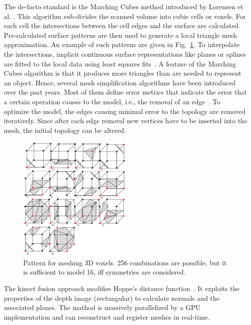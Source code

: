 \documentclass[twocolumn,oneside]{book}
\begin{document}
\begin{itemize}
  The de-facto standard is the Marching Cubes method introduced by
  Lorensen et al. \cite{lorensen87marching}. This algorithm
  sub-divides the scanned volume into cubic cells or voxels. For each
  cell the intersections between the cell edges and the surface are
  calculated. Pre-calculated surface patterns are then used to
  generate a local triangle mesh approximation. An example of such
  patterns are given in Fig.~\ref{fig:patterns}. To interpolate the
  intersections, implicit continuous surface representations like
  planes or splines are fitted to the local data using least squares
  fits~\cite{alexa02computing, hoppe92surface}.
  A feature of the Marching Cubes algorithm is that it produces more
  triangles than are needed to represent an object.  Hence, several
  mesh simplification algorithms have been introduced over the past
  years. Most of them define error metrics that indicate the error
  that a certain operation causes to the model, i.e., the removal of
  an edge~\cite{melax98simple, garland97surface}. To optimize the
  model, the edges causing minimal error to the topology are removed
  iteratively. Since after each edge removal new vertices have to be
  inserted into the mesh, the initial topology can be altered.
\begin{figure}
    \includegraphics[width=0.5\textwidth]{BOOKFIGS/marching_cube_patterns}
\caption{Pattern for meshing 3D voxels. 256 combinations are possible,
  but it is sufficient to model 16, iff symmetries are considered.
\label{fig:patterns}}
\end{figure}

  The kinect fusion approach modifies Hoppe's distance
  function~\cite{kinectfusion}. It exploits the properties of the
  depth image (rectangular) to calculate normals and the associated
  planes. The mathod is massively parallelized by a GPU implementation
  and can reconstruct and register meshes in real-time.


\end{itemize}
\end{document}
